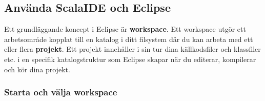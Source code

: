\begin{enumerate}
\end{enumerate}


\subsection{Använda ScalaIDE och Eclipse}\label{appendix:ide:eclipse:use}

Ett grundläggande koncept i Eclipse är \textbf{workspace}. Ett workspace utgör ett arbetsområde kopplat till en katalog i ditt filsystem där du kan arbeta med ett eller flera \textbf{projekt}. Ett projekt innehåller i sin tur dina källkodsfiler och klassfiler etc. i en specifik katalogstruktur som Eclipse skapar när du editerar, kompilerar och kör dina projekt.

\subsubsection{Starta och välja workspace}\label{subsubsection:start:eclipse}

